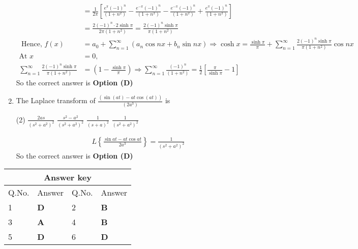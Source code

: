 \begin{enumerate}[label=\color{ocre}\textbf{\arabic*.}]
\begin{answer}
\begin{align*}
		&=\frac{1}{2 \pi}\left[\frac{e^{\pi}(-1)^{n}}{\left(1+n^{2}\right)}-\frac{e^{-\pi}(-1)^{n}}{\left(1+n^{2}\right)}-\frac{e^{-\pi}(-1)^{n}}{\left(1+n^{2}\right)}+\frac{e^{\pi}(-1)^{n}}{\left(1+n^{2}\right)}\right]\\&=\frac{2(-1)^{n} \cdot 2 \sinh \pi}{2 \pi\left(1+n^{2}\right)}=\frac{2(-1)^{n} \sinh \pi}{\pi\left(1+n^{2}\right)}\\
		\text{	Hence, }f(x)&=a_{0}+\sum_{n=1}^{\infty}\left(a_{n} \cos n x+b_{n} \sin n x\right) \Rightarrow \cosh x=\frac{\sinh \pi}{\pi}+\sum_{n=1}^{\infty} \frac{2(-1)^{n} \sinh \pi}{\pi\left(1+n^{2}\right)} \cos n x\\
		\text{At }x&=0,\\
		\sum_{n=1}^{\infty} \frac{2(-1)^{n} \sinh \pi}{\pi\left(1+n^{2}\right)}&=\left(1-\frac{\sinh \pi}{\pi}\right) \Rightarrow \sum_{n=1}^{\infty} \frac{(-1)^{n}}{\left(1+n^{2}\right)}=\frac{1}{2}\left[\frac{\pi}{\sinh \pi}-1\right]
		\end{align*}
		So the correct answer is \textbf{Option (D)}
	\end{answer}
	\item The Laplace transform of $\frac{(\sin (a t)-a t \cos (a t))}{\left(2 a^{3}\right)}$ is
	{}
	\begin{tasks}(2)
		\task[\textbf{A.}]$\frac{2 a s}{\left(s^{2}+a^{2}\right)^{2}}$
		\task[\textbf{B.}]$\frac{s^{2}-a^{2}}{\left(s^{2}+a^{2}\right)^{2}}$
		\task[\textbf{C.}]$\frac{1}{(s+a)^{2}}$
		\task[\textbf{D.}] $\frac{1}{\left(s^{2}+a^{2}\right)^{2}}$
	\end{tasks}
	\begin{answer}
		\begin{align*}
		L\left\{\frac{\sin a t-a t \cos a t}{2 a^{3}}\right\}=\frac{1}{\left(s^{2}+a^{2}\right)^{2}}
		\end{align*}
		So the correct answer is \textbf{Option (D)}
	\end{answer}
\end{enumerate}
\setlength\arrayrulewidth{1pt}
\begin{table}[H]
	\centering
	\begin{tabular}{|p{1.5cm}|p{1.5cm}||p{1.5cm}|p{1.5cm}|}
		\hline
		\multicolumn{4}{|c|}{\textbf{Answer key}}\\\hline\hline
		\rowcolor{ocrel}Q.No.&Answer&Q.No.&Answer\\\hline
		1&\textbf{D} &2&\textbf{B}\\\hline 
		3&\textbf{A} &4&\textbf{B} \\\hline
		5&\textbf{D} &6&\textbf{D} \\\hline
		
	\end{tabular}
\end{table}